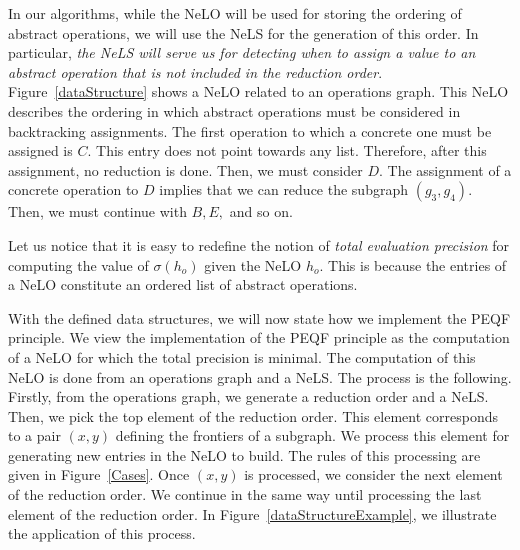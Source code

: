 \documentclass[a4paper]{article}
\begin{document}
In our algorithms, while the NeLO will be used for storing the ordering of abstract operations, we 
will use the NeLS for the generation of this order. In particular, {\it the NeLS will serve us for 
detecting when to assign a value to an abstract operation that is not included in the reduction order}. 
Figure~\ref{dataStructure}  shows a NeLO related to an operations graph. This NeLO describes the ordering in 
which abstract operations must be considered in backtracking assignments. The first 
operation to which a concrete one must be assigned is $C$. This entry does not point towards any list. 
Therefore, after this assignment, no reduction is done. Then, we must consider $D$. The assignment of 
a concrete operation to $D$ implies that we can reduce the subgraph $(g_3, g_4)$. 
Then, we must continue with $B, E,$ and so on. 

Let us notice that it is easy to redefine the notion of {\it total evaluation precision} for 
computing the value of $\sigma(h_o)$ given the NeLO $h_o$. This is because the entries of a NeLO 
constitute an ordered list of abstract operations. 

With the defined data structures, we will now state how we implement the 
PEQF principle. We view the implementation of the PEQF principle as the computation of a NeLO for which the 
total precision is minimal. The computation of this NeLO is done from an operations graph and a NeLS. 
The process is the following. Firstly, from the operations graph, we generate a reduction order and a NeLS. 
Then, we pick the top element of the reduction order. This element corresponds to a pair $(x,y)$ defining the 
frontiers of a subgraph. We process this element for generating new entries in the NeLO to build. The rules of 
this processing are given in Figure~\ref{Cases}. Once $(x,y)$ is processed, we consider the next element of the 
reduction order. We continue in the same way until processing the last element 
of the reduction order. In Figure~\ref{dataStructureExample}, we illustrate the application of 
this process. 
\end{document}
